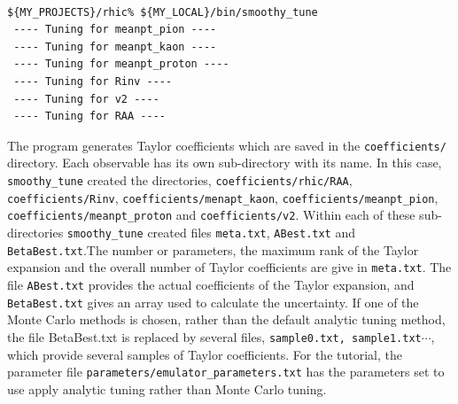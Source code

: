 \documentclass[UserManual.tex]{subfiles}
\begin{document}
{\tt
\begin{verbatim}
${MY_PROJECTS}/rhic% ${MY_LOCAL}/bin/smoothy_tune
 ---- Tuning for meanpt_pion ----
 ---- Tuning for meanpt_kaon ----
 ---- Tuning for meanpt_proton ----
 ---- Tuning for Rinv ----
 ---- Tuning for v2 ----
 ---- Tuning for RAA ----
\end{verbatim}
}
The program generates Taylor coefficients which are saved in the {\tt coefficients/} directory. Each observable has its own sub-directory with its name. In this case, {\tt smoothy\_tune} created the directories, {\tt coefficients/rhic/RAA}, {\tt coefficients/Rinv}, {\tt coefficients/menapt\_kaon}, {\tt coefficients/meanpt\_pion}, {\tt coefficients/meanpt\_proton} and {\tt coefficients/v2}. Within each of these sub-directories {\tt smoothy\_tune} created files {\tt meta.txt}, {\tt ABest.txt} and {\tt BetaBest.txt}.The number or parameters, the maximum rank of the Taylor expansion and the overall number of Taylor coefficients are give in {\tt meta.txt}. The file {\tt ABest.txt} provides the actual coefficients of the Taylor expansion, and {\tt BetaBest.txt} gives an array used to calculate the uncertainty. If one of the Monte Carlo methods is chosen, rather than the default analytic tuning method, the file {BetaBest.txt} is replaced by several files, {\tt sample0.txt, sample1.txt}$\cdots$, which provide several samples of Taylor coefficients. For the tutorial, the parameter file {\tt parameters/emulator\_parameters.txt} has the parameters set to use apply analytic tuning rather than Monte Carlo tuning.
\end{document}
